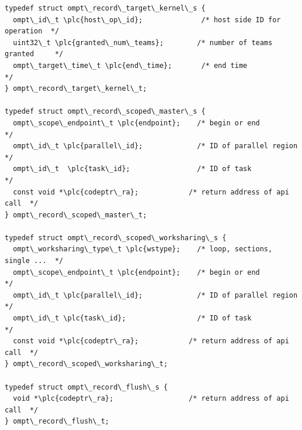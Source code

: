 \documentclass{article}
\begin{document}
\begin{boxedcode}
\begin{verbatim}
typedef struct ompt\_record\_target\_kernel\_s {
  ompt\_id\_t \plc{host\_op\_id};              /* host side ID for operation  */
  uint32\_t \plc{granted\_num\_teams};        /* number of teams granted     */
  ompt\_target\_time\_t \plc{end\_time};       /* end time                    */
} ompt\_record\_target\_kernel\_t;

typedef struct ompt\_record\_scoped\_master\_s {
  ompt\_scope\_endpoint\_t \plc{endpoint};    /* begin or end                */
  ompt\_id\_t \plc{parallel\_id};             /* ID of parallel region       */
  ompt\_id\_t  \plc{task\_id};                /* ID of task                  */
  const void *\plc{codeptr\_ra};            /* return address of api call  */
} ompt\_record\_scoped\_master\_t;

typedef struct ompt\_record\_scoped\_worksharing\_s {
  ompt\_worksharing\_type\_t \plc{wstype};    /* loop, sections, single ...  */
  ompt\_scope\_endpoint\_t \plc{endpoint};    /* begin or end                */
  ompt\_id\_t \plc{parallel\_id};             /* ID of parallel region       */
  ompt\_id\_t \plc{task\_id};                 /* ID of task                  */
  const void *\plc{codeptr\_ra};            /* return address of api call  */
} ompt\_record\_scoped\_worksharing\_t;

typedef struct ompt\_record\_flush\_s {
  void *\plc{codeptr\_ra};                  /* return address of api call  */
} ompt\_record\_flush\_t;


\end{verbatim}
\end{boxedcode}
\end{document}
